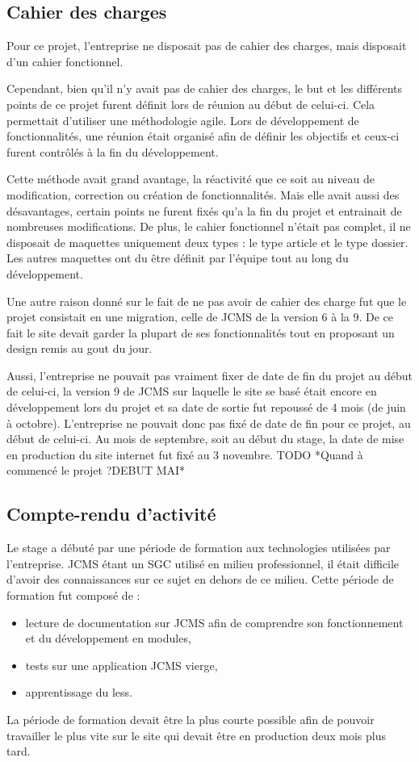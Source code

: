 \documentclass[12pt,a4paper]{article}
\begin{document}
\subsection{Cahier des charges}
Pour ce projet, l'entreprise ne disposait pas de cahier des charges, mais disposait d'un cahier fonctionnel.\par
Cependant, bien qu'il n'y avait pas de cahier des charges, le but et les différents points de ce projet furent définit lors de réunion au début de celui-ci. Cela permettait d'utiliser une méthodologie agile. Lors de développement de fonctionnalités, une réunion était organisé afin de définir les objectifs et ceux-ci furent contrôlés à la fin du développement.\par 
Cette méthode avait grand avantage, la réactivité que ce soit au niveau de modification, correction ou création de fonctionnalités. Mais elle avait aussi des désavantages, certain points ne furent fixés qu'a la fin du projet et entrainait de nombreuses modifications. De plus, le cahier fonctionnel n'était pas complet, il ne disposait de maquettes uniquement deux types : le type article et le type dossier. Les autres maquettes ont du être définit par l'équipe tout au long du développement. \par 
Une autre raison donné sur le fait de ne pas avoir de cahier des charge fut que le projet consistait en une migration, celle de JCMS de la version 6 à la 9. De ce fait le site devait garder la plupart de ses fonctionnalités tout en proposant un design remis au gout du jour.\par 
Aussi, l'entreprise ne pouvait pas vraiment fixer de date de fin du projet au début de celui-ci, la version 9 de JCMS sur laquelle le site se basé était encore en développement lors du projet et sa date de sortie fut repoussé de 4 mois (de juin à octobre). L'entreprise ne pouvait donc pas fixé de date de fin pour ce projet, au début de celui-ci. Au mois de septembre, soit au début du stage, la date de mise en production du site internet fut fixé au 3 novembre. TODO *Quand à commencé le projet ?DEBUT MAI*\par

\subsection{Compte-rendu d'activité}
Le stage a débuté par une période de formation aux technologies utilisées par l'entreprise. JCMS étant un SGC utilisé en milieu professionnel, il était difficile d'avoir des connaissances sur ce sujet en dehors de ce milieu. Cette période de formation fut composé de :
\begin{itemize}
\item lecture de documentation sur JCMS afin de comprendre son fonctionnement et du développement en modules,
\item tests sur une application JCMS vierge,
\item apprentissage du less.
\end{itemize} 
La période de formation devait être la plus courte possible afin de pouvoir travailler le plus vite sur le site qui devait être en production deux mois plus tard. \par
\end{document}
